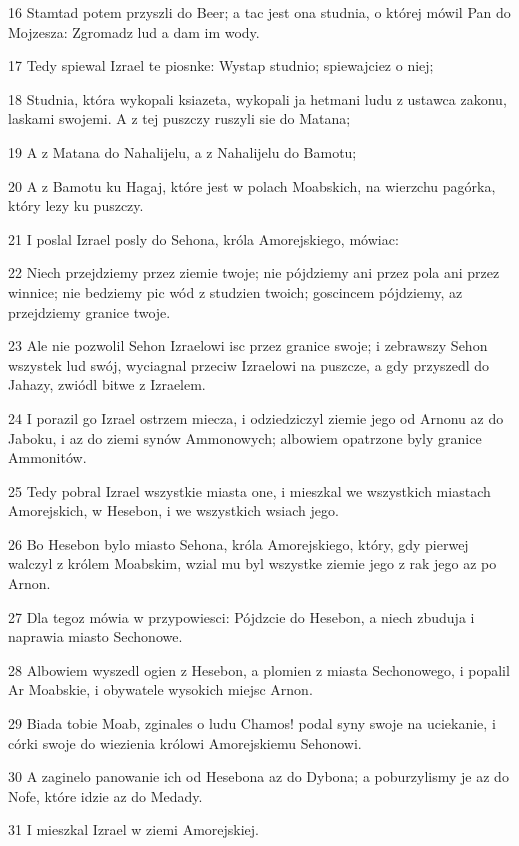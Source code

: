 \par 16 Stamtad potem przyszli do Beer; a tac jest ona studnia, o której mówil Pan do Mojzesza: Zgromadz lud a dam im wody.
\par 17 Tedy spiewal Izrael te piosnke: Wystap studnio; spiewajciez o niej;
\par 18 Studnia, która wykopali ksiazeta, wykopali ja hetmani ludu z ustawca zakonu, laskami swojemi. A z tej puszczy ruszyli sie do Matana;
\par 19 A z Matana do Nahalijelu, a z Nahalijelu do Bamotu;
\par 20 A z Bamotu ku Hagaj, które jest w polach Moabskich, na wierzchu pagórka, który lezy ku puszczy.
\par 21 I poslal Izrael posly do Sehona, króla Amorejskiego, mówiac:
\par 22 Niech przejdziemy przez ziemie twoje; nie pójdziemy ani przez pola ani przez winnice; nie bedziemy pic wód z studzien twoich; goscincem pójdziemy, az przejdziemy granice twoje.
\par 23 Ale nie pozwolil Sehon Izraelowi isc przez granice swoje; i zebrawszy Sehon wszystek lud swój, wyciagnal przeciw Izraelowi na puszcze, a gdy przyszedl do Jahazy, zwiódl bitwe z Izraelem.
\par 24 I porazil go Izrael ostrzem miecza, i odziedziczyl ziemie jego od Arnonu az do Jaboku, i az do ziemi synów Ammonowych; albowiem opatrzone byly granice Ammonitów.
\par 25 Tedy pobral Izrael wszystkie miasta one, i mieszkal we wszystkich miastach Amorejskich, w Hesebon, i we wszystkich wsiach jego.
\par 26 Bo Hesebon bylo miasto Sehona, króla Amorejskiego, który, gdy pierwej walczyl z królem Moabskim, wzial mu byl wszystke ziemie jego z rak jego az po Arnon.
\par 27 Dla tegoz mówia w przypowiesci: Pójdzcie do Hesebon, a niech zbuduja i naprawia miasto Sechonowe.
\par 28 Albowiem wyszedl ogien z Hesebon, a plomien z miasta Sechonowego, i popalil Ar Moabskie, i obywatele wysokich miejsc Arnon.
\par 29 Biada tobie Moab, zginales o ludu Chamos! podal syny swoje na uciekanie, i córki swoje do wiezienia królowi Amorejskiemu Sehonowi.
\par 30 A zaginelo panowanie ich od Hesebona az do Dybona; a poburzylismy je az do Nofe, które idzie az do Medady.
\par 31 I mieszkal Izrael w ziemi Amorejskiej.
